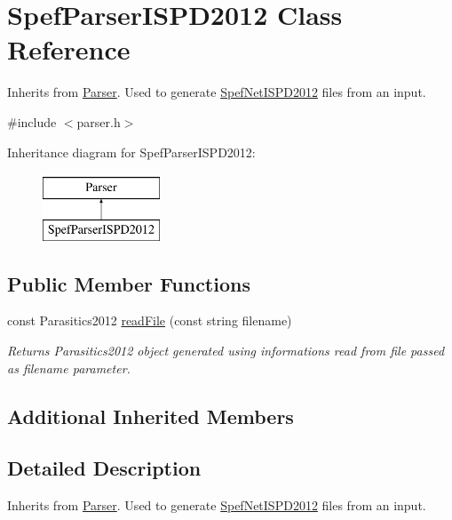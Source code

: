 \hypertarget{classSpefParserISPD2012}{\section{Spef\-Parser\-I\-S\-P\-D2012 Class Reference}
\label{classSpefParserISPD2012}
}


Inherits from \hyperlink{classParser}{Parser}. Used to generate \hyperlink{classSpefNetISPD2012}{Spef\-Net\-I\-S\-P\-D2012} files from an input.  




{\ttfamily \#include $<$parser.\-h$>$}

Inheritance diagram for Spef\-Parser\-I\-S\-P\-D2012\-:\begin{figure}[H]
\begin{center}
\leavevmode
\includegraphics[height=2.000000cm]{classSpefParserISPD2012}
\end{center}
\end{figure}
\subsection*{Public Member Functions}
\begin{DoxyCompactItemize}
\item 
const Parasitics2012 \hyperlink{classSpefParserISPD2012_a130209fe17a1d791cd03543304e48d5e}{read\-File} (const string filename)
\begin{DoxyCompactList}\small\item\em Returns Parasitics2012 object generated using informations read from file passed as filename parameter. \end{DoxyCompactList}\end{DoxyCompactItemize}
\subsection*{Additional Inherited Members}


\subsection{Detailed Description}
Inherits from \hyperlink{classParser}{Parser}. Used to generate \hyperlink{classSpefNetISPD2012}{Spef\-Net\-I\-S\-P\-D2012} files from an input. 

